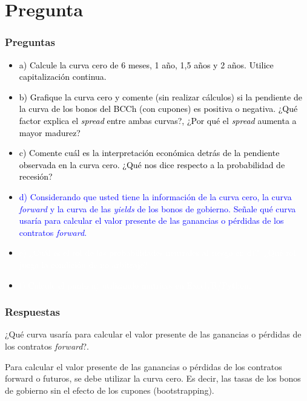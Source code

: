 \documentclass{beamer}
\newif\ifpresentacion
\newcommand{\pausa}{\ifpresentacion\pause\fi}
\begin{document}
\section{Pregunta }

\begin{frame}
  \frametitle{Preguntas}
  \begin{itemize}
    \scriptsize
    \item {\textcolor{black}{a) Calcule la curva cero de 6 meses, 1 año, 1,5 años y 2 años. Utilice capitalización continua.}}
    \vspace{3pt}
    \item {\textcolor{black}{b) Grafique la curva cero y comente (sin realizar cálculos) si la pendiente de la curva de los bonos del BCCh (con cupones) es positiva o negativa. ¿Qué factor explica el \textit{spread} entre ambas curvas?, ¿Por qué el \textit{spread} aumenta a mayor madurez?}}
    \vspace{3pt}
    \item {\textcolor{black}{c) Comente cuál es la interpretación económica detrás de la pendiente observada en la curva cero. ¿Qué nos dice respecto a la probabilidad de recesión?}}
    \vspace{3pt}
    \item {\Large\textcolor{blue}{d) Considerando que usted tiene la información de la curva cero, la curva \textit{forward} y la curva de las \textit{yields} de los bonos de gobierno. Señale qué curva usaría para calcular el valor presente de las ganancias o pérdidas de los contratos \textit{forward}.}}
    \vspace{3pt}
    \item {\textcolor{white}{e) ¿Cuál es el rol de las probabilidades neutrales al riesgo en d)?, ¿Qué rol juega la condición de no arbitraje?}}
    \vspace{3pt}
    \item {\textcolor{white}{f) Calcule el punto a) utilizando matrices en Excel/R/Python.}}
    \vspace{3pt}
  \end{itemize}
\end{frame}

\begin{frame}
  \frametitle{Respuestas }
  \begin{block}{ ¿Qué curva usaría para calcular el valor presente de las ganancias o pérdidas de los contratos \textit{forward}?.}
    \pausa
    Para calcular el valor presente de las ganancias o pérdidas de los contratos forward o
    futuros, se debe utilizar la curva cero. Es decir, las tasas de los bonos de gobierno sin el
    efecto de los cupones (bootstrapping).
  \end{block}
\end{frame}
\end{document}
